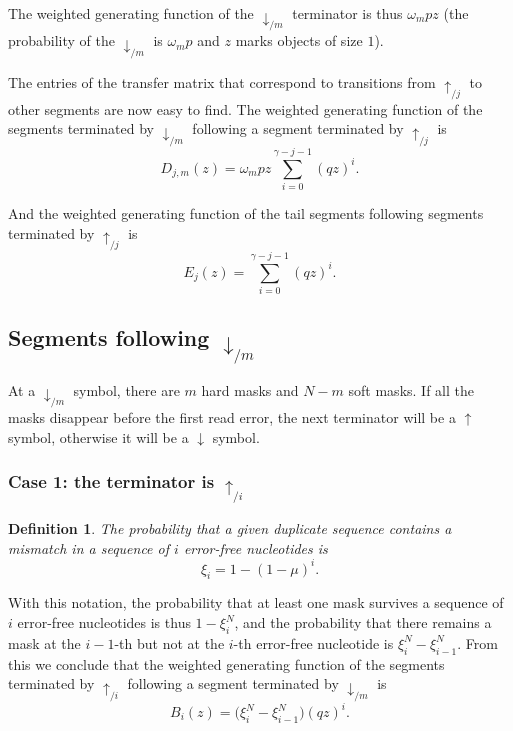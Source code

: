 \documentclass{article}
\newtheorem{definition}{Definition}
\begin{document}
The weighted generating function of the $\downarrow_{/m}$ terminator is
thus $\omega_m pz$ (the probability of the $\downarrow_{/m}$ is $\omega_m
p$ and $z$ marks objects of size $1$).

The entries of the transfer matrix that correspond to transitions from
$\uparrow_{/j}$ to other segments are now easy to find. The weighted
generating function of the segments terminated by $\downarrow_{/m}$
following a segment terminated by $\uparrow_{/j}$ is
\begin{equation}
\label{eq:D}
D_{j,m}(z) = \omega_m pz \sum_{i=0}^{\gamma-j-1} (qz)^i.
\end{equation}

And the weighted generating function of the tail segments following
segments terminated by $\uparrow_{/j}$ is
\begin{equation}
\label{eq:E}
E_j(z) = \sum_{i=0}^{\gamma-j-1} (qz)^i.
\end{equation}


\subsection{Segments following $\downarrow_{/m}$}

At a $\downarrow_{/m}$ symbol, there are $m$ hard masks and $N-m$ soft
masks. If all the masks disappear before the first read error, the next
terminator will be a $\uparrow$ symbol, otherwise it will be a
$\downarrow$ symbol.

\subsubsection*{Case 1: the terminator is $\uparrow_{/i}$}

\begin{definition}
The probability that a given duplicate sequence contains a mismatch in a
sequence of $i$ error-free nucleotides is
\begin{equation}
\label{eq:xi}
\xi_i = 1-(1-\mu)^i.
\end{equation}
\end{definition}

With this notation, the probability that at least one mask survives a
sequence of $i$ error-free nucleotides is thus $1-\xi_i^N$, and the
probability that there remains a mask at the $i-1$-th but not at the 
$i$-th error-free nucleotide is $\xi_i^N - \xi_{i-1}^N$. From this we
conclude that the weighted generating function of the segments terminated
by $\uparrow_{/i}$ following a segment terminated by $\downarrow_{/m}$ is
\begin{equation}
\label{eq:B}
B_i(z) = \Big( \xi_i^N-\xi_{i-1}^N \Big) (qz)^i.
\end{equation}
\end{document}
